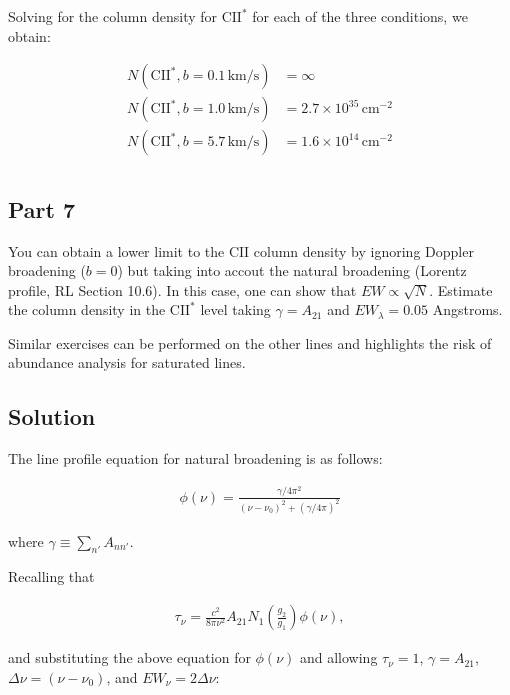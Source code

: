 \documentclass[12pt]{article}
\begin{document}
Solving for the column density for $\mathrm{CII^*}$ for each of the three conditions, we obtain:

\begin{equation*}
\begin{split}
N(\mathrm{CII^*}, b=0.1 \, \mathrm{km/s}) &= \infty\\
N(\mathrm{CII^*}, b=1.0 \, \mathrm{km/s}) &= 2.7 \times 10^{35} \, \mathrm{cm^{-2}}\\
N(\mathrm{CII^*}, b=5.7 \, \mathrm{km/s}) &= 1.6 \times 10^{14} \, \mathrm{cm^{-2}}\\
\end{split}
\end{equation*}

\subsection*{Part 7}

You can obtain a lower limit to the $\mathrm{CII}$ column density by ignoring Doppler broadening ($b = 0$) but taking into accout the natural broadening (Lorentz profile, RL Section 10.6). In this case, one can show that $EW \propto \sqrt{N}$. Estimate the column density in the $\mathrm{CII^*}$ level taking $\gamma = A_{21}$ and $EW_\lambda = 0.05$ Angstroms.

Similar exercises can be performed on the other lines and highlights the risk of abundance analysis for saturated lines.

\subsection*{Solution}

The line profile equation for natural broadening is as follows:

\begin{align*}
\phi(\nu) = \frac{\gamma/4\pi^2}{(\nu-\nu_0)^2 + (\gamma/4\pi)^2}
\end{align*}

where $\gamma \equiv \sum_{n'} A_{nn'}$.

Recalling that

\begin{align*}
\tau_\nu = \frac{c^2}{8\pi\nu^2}A_{21}N_1\left(\frac{g_2}{g_1}\right)\phi(\nu),
\end{align*}

and substituting the above equation for $\phi(\nu)$ and allowing $\tau_\nu=1$, $\gamma=A_{21}$, $\Delta\nu = (\nu-\nu_0)$, and $EW_\nu=2\Delta\nu:$
\end{document}
